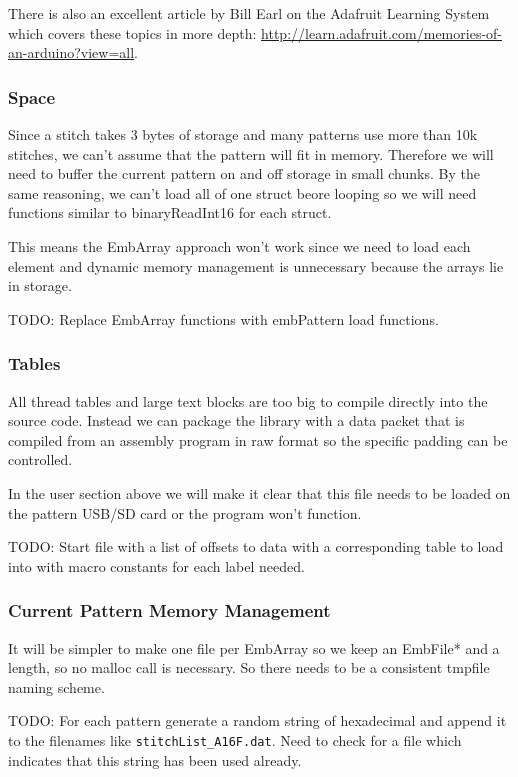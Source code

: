 \documentclass[a4paper, 11pt]{report}
\begin{document}
There is also an excellent article by Bill Earl on the Adafruit Learning
System which covers these topics in more depth:
\url{http://learn.adafruit.com/memories-of-an-arduino?view=all}.

\subsubsection{Space}

Since a stitch takes 3 bytes of storage and many patterns use more than
10k stitches, we can't assume that the pattern will fit in memory. Therefore
we will need to buffer the current pattern on and off storage in small
chunks. By the same reasoning, we can't load all of one struct beore
looping so we will need functions similar to binaryReadInt16 for each
struct.

This means the EmbArray approach won't work since we need to load
each element and dynamic memory management is unnecessary because
the arrays lie in storage.

TODO: Replace EmbArray functions with embPattern load functions.

\subsubsection{Tables}

All thread tables and large text blocks are too big to compile directly
into the source code. Instead we can package the library with a data packet
that is compiled from an assembly program in raw format so the specific
padding can be controlled.

In the user section above we will make it clear that this file
needs to be loaded on the pattern USB/SD card or the program won't function.

TODO: Start file with a list of offsets to data with a corresponding table
to load into with macro constants for each label needed.

\subsubsection{Current Pattern Memory Management}

It will be simpler to make one file per EmbArray so we keep an EmbFile*
and a length, so no malloc call is necessary. So there needs to be a consistent
tmpfile naming scheme.

TODO: For each pattern generate a random string of hexadecimal and append it
to the filenames like \texttt{stitchList\_A16F.dat}. Need to check for a file
which indicates that this string has been used already.
\end{document}
